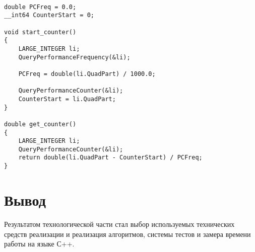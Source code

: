 \begin{lstlisting}[caption = {Функции замера процессорного времени работы функции}]

double PCFreq = 0.0;
__int64 CounterStart = 0;

void start_counter()
{
	LARGE_INTEGER li;
	QueryPerformanceFrequency(&li);
	
	PCFreq = double(li.QuadPart) / 1000.0;
	
	QueryPerformanceCounter(&li);
	CounterStart = li.QuadPart;
}

double get_counter()
{
	LARGE_INTEGER li;
	QueryPerformanceCounter(&li);
	return double(li.QuadPart - CounterStart) / PCFreq;
}
\end{lstlisting}

\section*{Вывод}
Результатом технологической части стал выбор используемых технических средств реализации и реализация алгоритмов, системы тестов и замера времени работы на языке С++.
